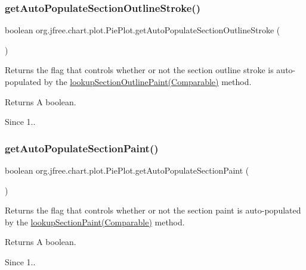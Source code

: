 \subsubsection{\texorpdfstring{get\+Auto\+Populate\+Section\+Outline\+Stroke()}{getAutoPopulateSectionOutlineStroke()}}
{\footnotesize\ttfamily boolean org.\+jfree.\+chart.\+plot.\+Pie\+Plot.\+get\+Auto\+Populate\+Section\+Outline\+Stroke (\begin{DoxyParamCaption}{ }\end{DoxyParamCaption})}

Returns the flag that controls whether or not the section outline stroke is auto-\/populated by the \mbox{\hyperlink{classorg_1_1jfree_1_1chart_1_1plot_1_1_pie_plot_a313892afd8de6bc0452c5c8c06d076fc}{lookup\+Section\+Outline\+Paint(\+Comparable)}} method.

\begin{DoxyReturn}{Returns}
A boolean.
\end{DoxyReturn}
\begin{DoxySince}{Since}
1.. 
\end{DoxySince}
\mbox{\label{classorg_1_1jfree_1_1chart_1_1plot_1_1_pie_plot_a3765f76c003c6a46ab710dd190bc544a}} 
\subsubsection{\texorpdfstring{get\+Auto\+Populate\+Section\+Paint()}{getAutoPopulateSectionPaint()}}
{\footnotesize\ttfamily boolean org.\+jfree.\+chart.\+plot.\+Pie\+Plot.\+get\+Auto\+Populate\+Section\+Paint (\begin{DoxyParamCaption}{ }\end{DoxyParamCaption})}

Returns the flag that controls whether or not the section paint is auto-\/populated by the \mbox{\hyperlink{classorg_1_1jfree_1_1chart_1_1plot_1_1_pie_plot_a4b18bc37829ff565c72d2bdd1acd0bb7}{lookup\+Section\+Paint(\+Comparable)}} method.

\begin{DoxyReturn}{Returns}
A boolean.
\end{DoxyReturn}
\begin{DoxySince}{Since}
1.. 
\end{DoxySince}
\mbox{\label{classorg_1_1jfree_1_1chart_1_1plot_1_1_pie_plot_a09734d6fd44506facb9a597034af3eea}} 
